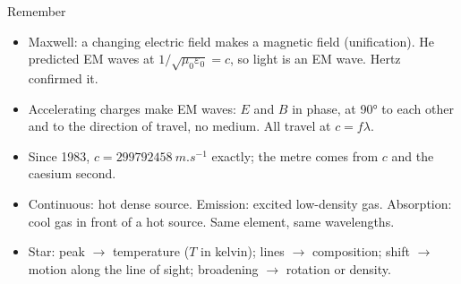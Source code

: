\begin{summarybox}{Remember}
\begin{itemize}
  \item Maxwell: a changing electric field makes a magnetic field (unification). He predicted EM
        waves at $1/\sqrt{\mu_0\varepsilon_0} = c$, so light is an EM wave. Hertz confirmed it.
  \item Accelerating charges make EM waves: $E$ and $B$ in phase, at \ang{90} to each other and
        to the direction of travel, no medium. All travel at $c = f\lambda$.
  \item Since 1983, $c = \qty{299792458}{m.s^{-1}}$ exactly; the metre comes from $c$ and the
        caesium second.
  \item Continuous: hot dense source. Emission: excited low-density gas. Absorption: cool gas in
        front of a hot source. Same element, same wavelengths.
  \item Star: peak $\to$ temperature ($T$ in kelvin); lines $\to$ composition; shift $\to$ motion
        along the line of sight; broadening $\to$ rotation or density.
\end{itemize}
\end{summarybox}
